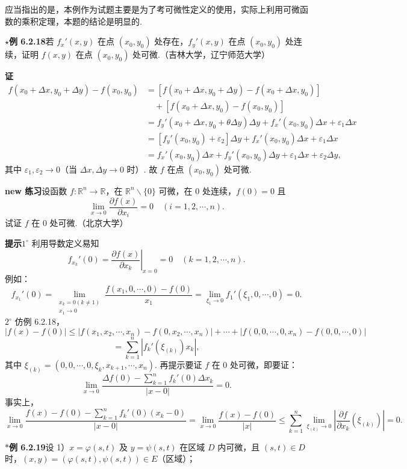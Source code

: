 \documentclass[UTF8, 12pt, fontset=fandol, oneside]{ctexart}
\begin{document}
应当指出的是，本例作为试题主要是为了考可微性定义的使用，实际上利用可微函数的乘积定理，本题的结论是明显的.

\noindent\textbf{\ensuremath{\star}例 6.2.18}\quad 若 $f_x'(x,y)$ 在点 $(x_0,y_0)$ 处存在，$f_y'(x,y)$ 在点 $(x_0,y_0)$ 处连续，证明 $f(x,y)$ 在点 $(x_0,y_0)$ 处可微.（吉林大学，辽宁师范大学）

\noindent\textbf{证}\quad
\[
\begin{aligned}
f(x_0+\Delta x,y_0+\Delta y)-f(x_0,y_0)
&=[f(x_0+\Delta x,y_0+\Delta y)-f(x_0+\Delta x,y_0)]\\
&\quad+[f(x_0+\Delta x,y_0)-f(x_0,y_0)]\\
&=f_y'(x_0+\Delta x,y_0+\theta\Delta y)\Delta y
+f_x'(x_0,y_0)\Delta x+\varepsilon_1\Delta x\\
&=[f_y'(x_0,y_0)+\varepsilon_2]\Delta y
+f_x'(x_0,y_0)\Delta x+\varepsilon_1\Delta x\\
&=f_x'(x_0,y_0)\Delta x+f_y'(x_0,y_0)\Delta y+\varepsilon_1\Delta x+\varepsilon_2\Delta y,
\end{aligned}
\]
其中 $\varepsilon_1,\varepsilon_2\to0$（当 $\Delta x,\Delta y\to0$ 时）. 故 $f$ 在点 $(x_0,y_0)$ 处可微.

\noindent\textbf{new 练习}\quad 设函数 $f:\mathbb{R}^n\to\mathbb{R}$，在 $\mathbb{R}^n\backslash\{0\}$ 可微，在 $0$ 处连续，$f(0)=0$ 且
\[
  \lim_{x\to0}\frac{\partial f(x)}{\partial x_i}=0\quad(i=1,2,\cdots,n).
\]
试证 $f$ 在 $0$ 处可微.（北京大学）

\noindent\textbf{提示}\quad $1^\circ$ 利用导数定义易知
\[
  f_{x_k}'(0)=\left.\frac{\partial f(x)}{\partial x_k}\right|_{x=0}=0\quad(k=1,2,\cdots,n).
\]
例如：
\[
  f_{x_1}'(0)=\lim_{\substack{x_k=0(k\ne1)\\x_1\to0}}
  \frac{f(x_1,0,\cdots,0)-f(0)}{x_1}
  =\lim_{\xi_1\to0}f_1'(\xi_1,0,\cdots,0)=0.
\]
$2^\circ$ 仿例 6.2.18，
\[
  |f(x)-f(0)|
  \le |f(x_1,x_2,\cdots,x_n)-f(0,x_2,\cdots,x_n)|+\cdots+
  |f(0,0,\cdots,0,x_n)-f(0,0,\cdots,0)|
\]
\[
  =\sum_{k=1}^n |f_k'(\xi_{(k)})x_k|,
\]
其中 $\xi_{(k)}=(0,0,\cdots,0,\xi_k,x_{k+1},\cdots,x_n)$. 再提示\quad 要证 $f$ 在 $0$ 处可微，即要证：
\[
  \lim_{x\to0}\frac{\Delta f(0)-\sum_{k=1}^n f_k'(0)\Delta x_k}{|x-0|}=0.
\]
事实上，
\[
  \lim_{x\to0}\frac{f(x)-f(0)-\sum_{k=1}^n f_k'(0)(x_k-0)}{|x-0|}
  =\lim_{x\to0}\frac{f(x)-f(0)}{|x|}
  \le\sum_{k=1}^n\lim_{\xi_{(k)}\to0}\left|\frac{\partial f}{\partial x_k}(\xi_{(k)})\right|=0.
\]

\noindent\textbf{$\ast$例 6.2.19}\quad 设 1）$x=\varphi(s,t)$ 及 $y=\psi(s,t)$ 在区域 $D$ 内可微，且 $(s,t)\in D$ 时，$(x,y)=(\varphi(s,t),\psi(s,t))\in E$（区域）；
\end{document}
